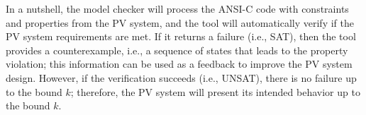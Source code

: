 \documentclass[review]{elsarticle}
\begin{document}
%
In a nutshell, the model checker will process the ANSI-C code with constraints %
and properties %
from the PV system, and the tool will automatically verify if the PV system requirements are met. If it returns a failure (i.e., SAT), then the tool provides a counterexample, i.e., a sequence of states that leads to the property violation; this information can be used as a feedback to improve the PV system design. However, if the verification succeeds (i.e., UNSAT), there is no failure up to the bound $k$; therefore, the PV system will present its intended behavior up to the bound $k$.
%
%
%
% 
%
%
%
\end{document}
